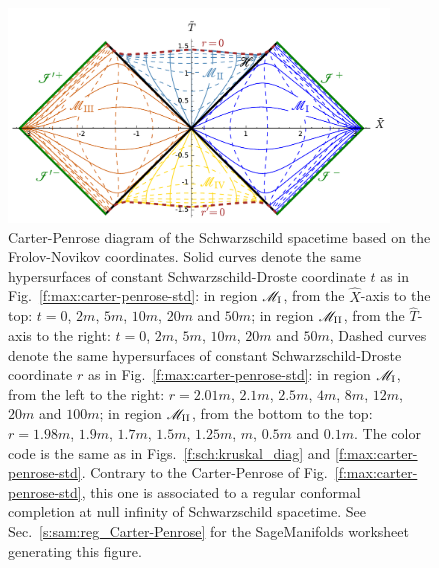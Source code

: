 \begin{figure}
\centerline{\includegraphics[width=0.9\textwidth]{max_carter-penrose-FN.pdf}}
\caption[]{\label{f:max:carter-penrose-FN} \footnotesize
Carter-Penrose diagram of the Schwarzschild spacetime based on the Frolov-Novikov coordinates.
Solid curves denote the same hypersurfaces of constant Schwarzschild-Droste coordinate
$t$ as in Fig.~\ref{f:max:carter-penrose-std}: in region $\mathscr{M}_{\rm I}$, from the $\hat{X}$-axis to the top: $t=0$, $2m$,
$5m$, $10m$, $20m$ and $50m$;
in region $\mathscr{M}_{\rm II}$, from the $\hat{T}$-axis
to the right: $t=0$, $2m$, $5m$, $10m$, $20m$ and $50m$,
Dashed curves denote the same hypersurfaces of constant Schwarzschild-Droste coordinate
$r$ as in Fig.~\ref{f:max:carter-penrose-std}: in region $\mathscr{M}_{\rm I}$, from the left to the right: $r=2.01m$, $2.1m$, $2.5m$, $4m$, $8m$, $12m$, $20m$ and $100m$;
in region $\mathscr{M}_{\rm II}$, from the bottom to the top: $r=1.98m$, $1.9m$, $1.7m$,
$1.5m$, $1.25m$, $m$, $0.5m$ and $0.1m$.
The color code
is the same as in Figs.~\ref{f:sch:kruskal_diag} and \ref{f:max:carter-penrose-std}.
Contrary to the Carter-Penrose of Fig.~\ref{f:max:carter-penrose-std}, this one is
associated to a regular conformal completion at null infinity of Schwarzschild spacetime. See Sec.~\ref{s:sam:reg_Carter-Penrose} for the
SageManifolds worksheet generating this figure.}
\end{figure}



